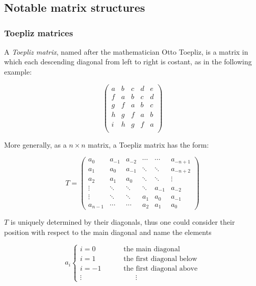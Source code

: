 \appendix
\chapter{}

\section{Notable matrix structures} \label{app:matrices}

\subsection{Toepliz matrices}
\label{sec:matrices}

A \emph{Toepliz matrix}, named after the mathematician Otto Toepliz, is a matrix in which each descending diagonal from left to right is costant, as in the following example:

$$
\begin{pmatrix}
a & b & c & d & e \\
f & a & b & c & d \\
g & f & a & b & c \\
h & g & f & a & b \\
i & h & g & f & a \\
\end{pmatrix}
$$

More generally, as a $n \times n$ matrix, a Toepliz matrix has the form:

$$T = \begin{pmatrix}
a_0 & a_{-1} & a_{-2} & \cdots & \cdots & a_{-n+1} \\
a_1 & a_0 & a_{-1} & \ddots & \ddots & a_{-n+2} \\
a_2 & a_1 & a_0 & \ddots & \ddots &\vdots \\
\vdots & \ddots & \ddots & \ddots & a_{-1} & a_{-2} \\
\vdots & \ddots & \ddots & a_1 & a_0 & a_{-1} \\
a_{n-1} & \cdots & \cdots & a_2 & a_1 & a_0
\end{pmatrix}
$$

$T$ is uniquely determined by their diagonals, thus one could consider their position with respect to the main diagonal and name the elements

$$a_i \left\{ \begin{array}{ll}
i=0 &\qquad \mbox{ the main diagonal} \\
i=1 &\qquad \mbox{ the first diagonal below}\\
i=-1&\qquad \mbox{ the first diagonal above} \\
\vdots & \qquad \qquad \vdots
\end{array} \right.$$


